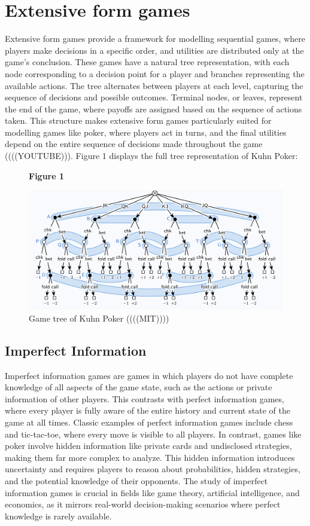 \documentclass{article}
\begin{document}
\section{Extensive form games}

Extensive form games provide a framework for modelling sequential games, where players make decisions in a specific order, and utilities are distributed only at the game's conclusion. These games have a natural tree representation, with each node corresponding to a decision point for a player and branches representing the available actions. The tree alternates between players at each level, capturing the sequence of decisions and possible outcomes. Terminal nodes, or leaves, represent the end of the game, where payoffs are assigned based on the sequence of actions taken. This structure makes extensive form games particularly suited for modelling games like poker, where players act in turns, and the final utilities depend on the entire sequence of decisions made throughout the game ((((YOUTUBE))). Figure 1 displays the full tree representation of Kuhn Poker:

\begin{figure}
    \centering
    \textbf{Figure 1}\par\medskip
\includegraphics[scale=.44]{game_tree}
    \caption{Game tree of Kuhn Poker ((((MIT))))}
\end{figure}


\subsection{Imperfect Information}
Imperfect information games are games in which players do not have complete knowledge of all aspects of the game state, such as the actions or private information of other players. This contrasts with perfect information games, where every player is fully aware of the entire history and current state of the game at all times. Classic examples of perfect information games include chess and tic-tac-toe, where every move is visible to all players. In contrast, games like poker involve hidden information like private cards and undisclosed strategies, making them far more complex to analyze. This hidden information introduces uncertainty and requires players to reason about probabilities, hidden strategies, and the potential knowledge of their opponents. The study of imperfect information games is crucial in fields like game theory, artificial intelligence, and economics, as it mirrors real-world decision-making scenarios where perfect knowledge is rarely available.
\end{document}
